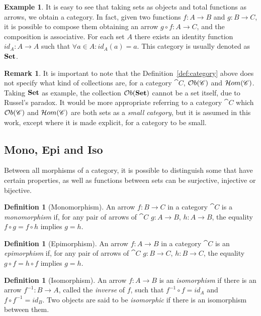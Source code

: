 \documentclass[a4paper, twoside,openright]{report}
\theoremstyle{plain}
\theoremstyle{definition}
\newtheorem{definition}[theorem]{Definition}
\newtheorem{example}[theorem]{Example}
\newtheorem{remark}[theorem]{Remark}
\begin{document}
\begin{example}
    It is easy to see that taking sets as objects and total functions as arrows, we obtain a category. In fact, given two functions $f: A \rightarrow B$ and $g: B \rightarrow C$, it is possible to compose them obtaining an arrow $g \circ f : A \rightarrow C$, and the composition is associative. For each set $A$ there exists an identity function $id_A: A \rightarrow A$ such that $\forall a \in A: id_A(a) = a$.
    This category is usually denoted as $\mathbf{Set}$.
\end{example}


\begin{remark}\label{rem:small_cats}
    It is important to note that the Definition~\ref{def:category} above does not specify what kind of collections are, for a category $\cat{C}$, $\mathcal{O}b(\mathscr{C})$ and $\mathcal{H}om(\mathscr{C})$.
    Taking $\mathbf{Set}$ as example, the collection $\mathcal{O}b(\mathbf{Set})$ cannot be a set itself, due to Russel's paradox. It would be more appropriate referring to a category $\cat{C}$ which $\mathcal{O}b(\mathscr{C})$ and $\mathcal{H}om(\mathscr{C})$ are both sets as a \emph{small category}, but it is assumed in this work, except where it is made explicit, for a category to be small.
\end{remark}

\subsection{Mono, Epi and Iso}

Between all morphisms of a category, it is possible to distinguish some that have certain properties, as well as functions between sets can be surjective, injective or bijective.

\begin{definition}[Monomorphism]\label{def:mono}
    An arrow $f:B\rightarrow C$ in a category $\cat{C}$ is a \emph{monomorphism} if, for any pair of arrows of $\cat{C}$ $g:A \rightarrow B$, $h: A \rightarrow B$, the equality $f \circ g = f \circ h$ implies $g = h$.
\end{definition}

\begin{definition}[Epimorphism]\label{def:epi}
    An arrow $f: A\rightarrow B$ in a category $\cat{C}$ is an \emph{epimorphism} if, for any pair of arrows of $\cat{C}$ $g : B \rightarrow C$, $h: B \rightarrow C$, the equality $g \circ f = h \circ f$ implies $g = h$.
\end{definition}

\begin{definition}[Isomorphism]\label{def:iso}
    An arrow $f:A \rightarrow B$ is an \emph{isomorphism} if there is an arrow $f^{-1}:B \rightarrow A$, called the \emph{inverse} of $f$, such that $f^{-1}\circ f = id_{A}$ and $f \circ f^{-1} = id_{B}$. Two objects are said to be \emph{isomorphic} if there is an isomorphism between them.
\end{definition}
\end{document}
